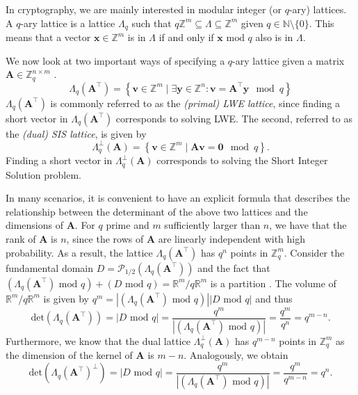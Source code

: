 In cryptography, we are mainly interested in modular integer (or $q$-ary) lattices. A $q$-ary lattice is a lattice $\Lambda_q$ such that $q\mathbb{Z}^m \subseteq	\Lambda \subseteq	\mathbb{Z}^m$ given $q \in \mathbb{N}\setminus \{0\}$. This means that a vector $\mathbf{x} \in \mathbb{Z}^m$ is in $\Lambda$ if and only if $\mathbf{x} \text{ mod } q$ also is in $\Lambda$.

We now look at two important ways of specifying a $q$-ary lattice given a matrix $\mathbf{A} \in \mathbb{Z}_q^{n\times m}$ \cite{BBGS19}.
\begin{equation}\label{eq:lwe-lattice}
    \Lambda_q(\mathbf{A}^\intercal) = \left\{ \mathbf{v} \in \mathbb{Z}^m \mid \exists \mathbf{y} \in \mathbb{Z}^n : \mathbf{v} = \mathbf{A}^\intercal \mathbf{y} \mod q \right\}
\end{equation}
$\Lambda_q(\mathbf{A}^\intercal)$ is commonly referred to as the \textit{(primal) LWE lattice}, since finding a short vector in $\Lambda_q(\mathbf{A}^\intercal)$ corresponds to solving LWE. The second, referred to as the \textit{(dual) SIS lattice}, is given by
\begin{equation}\label{eq:sis-lattice}
    \Lambda_q^\perp(\mathbf{A}) = \left\{ \mathbf{v} \in \mathbb{Z}^m \mid  \mathbf{A}\mathbf{v} = \mathbf{0} \mod q \right\}.
\end{equation}
Finding a short vector in $\Lambda_q^\perp(\mathbf{A})$ corresponds to solving the Short Integer Solution problem.


In many scenarios, it is convenient to have an explicit formula that describes the relationship between the determinant of the above two lattices and the dimensions of $\mathbf{A}$. For $q$ prime and $m$ sufficiently larger than $n$, we have that the rank of $\mathbf{A}$ is $n$, since the rows of $\mathbf{A}$ are linearly independent with high probability. As a result, the lattice $\Lambda_q(\mathbf{A}^\intercal)$ has $q^n$ points in $\mathbb{Z}_q^m$.
Consider the fundamental domain $D = \mathcal{P}_{1/2}(\Lambda_q(\mathbf{A}^\intercal))$ and the fact that $(\Lambda_q(\mathbf{A}^\intercal) \text{ mod } q) + (D \text{ mod } q) = \mathbb{R}^m/q\mathbb{R}^m$ is a partition \cite{volume-lattice}. The volume of $\mathbb{R}^m/q\mathbb{R}^m$ is given by $q^m =|(\Lambda_q(\mathbf{A}^\intercal) \text{ mod } q)||D \text{ mod } q|$ and thus
\begin{equation}\label{eq:det-MR}
    \text{det}(\Lambda_q(\mathbf{A}^\intercal)) = |D \text{ mod } q| = \frac{q^m}{|(\Lambda_q(\mathbf{A}^\intercal) \text{ mod } q)|} = \frac{q^{m}}{q^{n}} = q^{m-n}.
\end{equation}
Furthermore, we know that the dual lattice  $\Lambda_q^\perp(\mathbf{A})$ has $q^{m-n}$ points in $\mathbb{Z}_q^m$ as the dimension of the kernel of $\mathbf{A}$ is $m-n$. Analogously, we obtain
\begin{equation}\label{eq:det-MR-dual}
    \text{det}(\Lambda_q(\mathbf{A}^\intercal)^{\perp}) = |D \text{ mod } q| = \frac{q^m}{|(\Lambda_q(\mathbf{A}^\intercal) \text{ mod } q)|} = \frac{q^{m}}{q^{m-n}} = q^n.
\end{equation}


